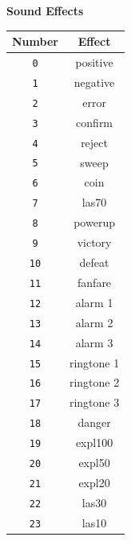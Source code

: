 \documentclass[12pt]{article}
\newcommand{\MonoSp}[1] {\fontsize{10pt}{10pt}\selectfont\texttt{#1}\normalsize}
\begin{document}
\begin{table}[h]
\centering\textbf{Sound Effects}  \\
\begin{tabular}{ | c | c | }         \hline
\textbf{Number} & \textbf{Effect} \\ \hline
\MonoSp{0}      & positive        \\ \hline
\MonoSp{1}      & negative        \\ \hline
\MonoSp{2}      & error           \\ \hline
\MonoSp{3}      & confirm         \\ \hline
\MonoSp{4}      & reject          \\ \hline
\MonoSp{5}      & sweep           \\ \hline
\MonoSp{6}      & coin            \\ \hline
\MonoSp{7}      & las70           \\ \hline
\MonoSp{8}      & powerup         \\ \hline
\MonoSp{9}      & victory         \\ \hline
\MonoSp{10}     & defeat          \\ \hline
\MonoSp{11}     & fanfare         \\ \hline
\MonoSp{12}     & alarm 1         \\ \hline
\MonoSp{13}     & alarm 2         \\ \hline
\MonoSp{14}     & alarm 3         \\ \hline
\MonoSp{15}     & ringtone 1      \\ \hline
\MonoSp{16}     & ringtone 2      \\ \hline
\MonoSp{17}     & ringtone 3      \\ \hline
\MonoSp{18}     & danger          \\ \hline
\MonoSp{19}     & expl100         \\ \hline
\MonoSp{20}     & expl50          \\ \hline
\MonoSp{21}     & expl20          \\ \hline
\MonoSp{22}     & las30           \\ \hline
\MonoSp{23}     & las10           \\ \hline
\end{tabular}
\end{table}
\end{document}
